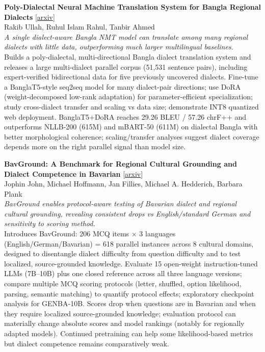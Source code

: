 \documentclass[12pt,letterpaper]{article}
\begin{document}
\medskip

{\small\textbf{Poly-Dialectal Neural Machine Translation System for Bangla Regional Dialects}} {\scriptsize[\href{https://arxiv.org/abs/2608.12018}{arxiv}]}\\
{\scriptsize Rakib Ullah, Ruhul Islam Rahul, Tanbir Ahmed}\\

{\small\textit{A single dialect-aware Bangla NMT model can translate among many regional dialects with little data, outperforming much larger multilingual baselines.}}\\[1pt]
{\footnotesize Builds a poly-dialectal, multi-directional Bangla dialect translation system and releases a large multi-dialect parallel corpus (51,531 sentence pairs), including expert-verified bidirectional data for five previously uncovered dialects. Fine-tune a BanglaT5-style seq2seq model for many dialect-pair directions; use DoRA (weight-decomposed low-rank adaptation) for parameter-efficient specialization; study cross-dialect transfer and scaling vs data size; demonstrate INT8 quantized web deployment. BanglaT5+DoRA reaches 29.26 BLEU / 57.26 chrF++ and outperforms NLLB-200 (615M) and mBART-50 (611M) on dialectal Bangla with better morphological coherence; scaling/transfer analyses suggest dialect coverage depends more on the right parallel signal than model size.}

\medskip

{\small\textbf{BavGround: A Benchmark for Regional Cultural Grounding and Dialect Competence in Bavarian}} {\scriptsize[\href{https://arxiv.org/abs/2608.12894}{arxiv}]}\\
{\scriptsize Jophin John, Michael Hoffmann, Jan Fillies, Michael A. Hedderich, Barbara Plank}\\

{\small\textit{BavGround enables protocol-aware testing of Bavarian dialect and regional cultural grounding, revealing consistent drops vs English/standard German and sensitivity to scoring method.}}\\[1pt]
{\footnotesize Introduces BavGround: 206 MCQ items × 3 languages (English/German/Bavarian) = 618 parallel instances across 8 cultural domains, designed to disentangle dialect difficulty from question difficulty and to test localized, source-grounded knowledge. Evaluate 15 open-weight instruction-tuned LLMs (7B--10B) plus one closed reference across all three language versions; compare multiple MCQ scoring protocols (letter, shuffled, option likelihood, parsing, semantic matching) to quantify protocol effects; exploratory checkpoint analysis for GENBA-10B. Scores drop when questions are in Bavarian and when they require localized source-grounded knowledge; evaluation protocol can materially change absolute scores and model rankings (notably for regionally adapted models). Continued pretraining can help some likelihood-based metrics but dialect competence remains comparatively weak.}
\end{document}
